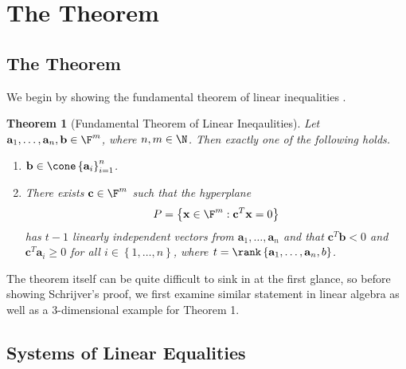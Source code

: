 \documentclass{article}
\newtheorem{theorem}{Theorem}
\renewcommand{\vec}{\mathbf}
\begin{document}
\section{The Theorem}

\subsection{The Theorem}

We begin by showing the fundamental theorem of linear inequalities \cite{TLIP}.
\begin{theorem}[Fundamental Theorem of Linear Ineqaulities]\label{ftli}
    Let $\vec{a}_1,\ldots,\vec{a}_n,\vec{b}\in\F^m$, where $n,m\in\N$. Then exactly one of the following holds.
    \begin{enumerate}
        \item $\vec{b}\in\cone\left\lbrace \vec{a}_i \right\rbrace ^{n}_{i=1}$.
        \item There exists $\vec{c}\in\F^m$ such that the hyperplane
            \begin{equation*}
                P = \left\lbrace \vec{x}\in\F^m: \vec{c}^{T} \vec{x} = 0 \right\rbrace 
            \end{equation*}
            has $t-1$ linearly independent vectors from $\vec{a}_1,\ldots,\vec{a}_n$ and that $\vec{c}^{T} \vec{b}<0$ and $\vec{c}^{T}\vec{a}_i\geq 0$ for all $i\in\left\lbrace 1,\ldots,n \right\rbrace$, where $t=\rank\left\lbrace \vec{a}_1,\ldots,\vec{a}_n,b \right\rbrace$.
    \end{enumerate}
\end{theorem}
The theorem itself can be quite difficult to sink in at the first glance, so before showing Schrijver's proof, we first examine similar statement in linear algebra as well as a 3-dimensional example for Theorem 1.

\subsection{Systems of Linear Equalities}
\end{document}
